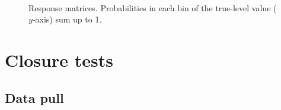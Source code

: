 \begin{figure}[h]
{\begin{subfigure}[b]{\linewidth}
  \end{subfigure}\\
  \begin{subfigure}[b]{\linewidth}\addtocounter{subfigure}{1}
                \vspace{50pt}
  \end{subfigure}
}%
\caption[Response matrices.]{Response matrices. Probabilities in each bin of the true-level value ($y$-axis) sum up to 1.}\label{fig:responseMatrices}
\end{figure}

\section{Closure tests}\label{sec:closureTests}
\subsection{Data pull}

